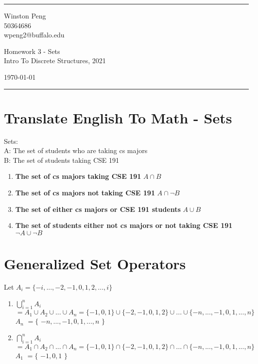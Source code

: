 \documentclass[a4paper]{article}
\begin{document}

\fancyhead[C]{}
\hrule \medskip %
\begin{minipage}{0.295\textwidth} 
\raggedright
\footnotesize
Winston Peng \hfill\\   
50364686 \hfill\\
wpeng2@buffalo.edu
\end{minipage}
\begin{minipage}{0.4\textwidth} 
\centering 
\large 
Homework 3 - Sets\\ 
\normalsize 
Intro To Discrete Structures, 2021\\ 
\end{minipage}
\begin{minipage}{0.295\textwidth} 
\raggedleft
\today\hfill\\
\end{minipage}
\medskip\hrule 
\bigskip

\section{Translate English To Math - Sets}
\large Sets: \smallskip \\
\normalsize
A: The set of students who are taking cs majors \\
B: The set of students taking CSE 191

\begin{enumerate}
    \item \textbf{The set of cs majors taking CSE 191} $A \cap B$
    \item \textbf{The set of cs majors not taking CSE 191} $A \cap \neg B$
    \item \textbf{The set of either cs majors or CSE 191 students} $A \cup B$
    \item \textbf{The set of students either not cs majors or not taking CSE 191} $\neg A \cup \neg B$
\end{enumerate}

\bigskip %

\section{Generalized Set Operators}
Let $A_i = \{-i, ...,-2, -1, 0, 1, 2, ..., i\}$
\begin{enumerate}
    \item \boldmath $\bigcup\limits_{i=1}^n A_i$ \unboldmath $= A_1 \cup A_2 \cup ... \cup A_n = \{-1, 0, 1\} \cup \{-2, -1, 0, 1, 2\} \cup ... \cup \{-n, ..., -1, 0, 1, ..., n\}$ \\
    \boldmath $A$\unboldmath $_n$ \boldmath $ = \{$ \unboldmath 
    $-n, ..., -1, 0, 1, ..., n$ 
    \boldmath $\}$
    \item $\bigcap\limits_{i=1}^n A_i$ \unboldmath $= A_1 \cap A_2 \cap ... \cap A_n = \{-1, 0, 1\} \cap \{-2, -1, 0, 1, 2\} \cap ... \cap \{-n, ..., -1, 0, 1, ..., n\}$ \\
    \boldmath $A$\unboldmath $_1$ \boldmath $= \{$ \unboldmath $-1, 0, 1$ \boldmath $\}$
\end{enumerate}
\end{document}
